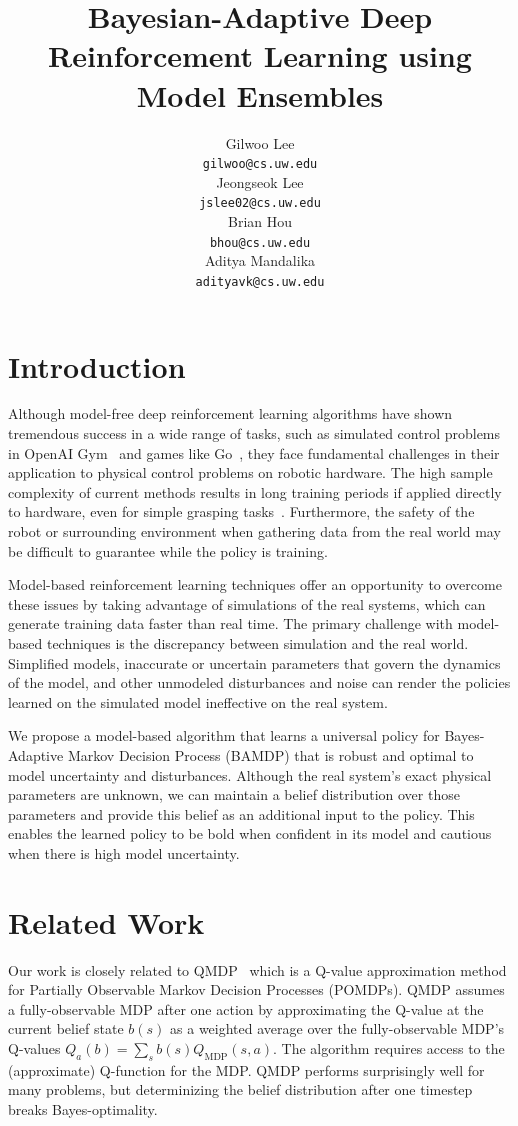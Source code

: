 \documentclass{article}
\title{Bayesian-Adaptive Deep Reinforcement Learning using Model Ensembles}
\author{
  Gilwoo Lee \\ \texttt{gilwoo@cs.uw.edu} \\
  \And
  Jeongseok Lee \\ \texttt{jslee02@cs.uw.edu} \\
  \And
  Brian Hou \\ \texttt{bhou@cs.uw.edu} \\
  \And
  Aditya Mandalika \\ \texttt{adityavk@cs.uw.edu} \\
}
\begin{document}
\maketitle


\section{Introduction}
Although model-free deep reinforcement learning algorithms have shown tremendous success in a wide range of tasks, such as simulated control problems in OpenAI Gym~\cite{openai-gym} and games like Go~\cite{alphago}, they face fundamental challenges in their application to physical control problems on robotic hardware.
The high sample complexity of current methods results in long training periods if applied directly to hardware, even for simple grasping tasks~\cite{levine2016armfarm}.
Furthermore, the safety of the robot or surrounding environment when gathering data from the real world may be difficult to guarantee while the policy is training.

Model-based reinforcement learning techniques offer an opportunity to overcome these issues by taking advantage of simulations of the real systems, which can generate training data faster than real time.
The primary challenge with model-based techniques is the discrepancy between simulation and the real world.
Simplified models, inaccurate or uncertain parameters that govern the dynamics of the model, and other unmodeled disturbances and noise can render the policies learned on the simulated model ineffective on the real system.

We propose a model-based algorithm that learns a universal policy for Bayes-Adaptive Markov Decision Process (BAMDP) that is robust and optimal to model uncertainty and disturbances. Although the real system's exact physical parameters are unknown, we can maintain a belief distribution over those parameters and provide this belief as an additional input to the policy.
This enables the learned policy to be bold when confident in its model and cautious when there is high model uncertainty.

\section{Related Work}
Our work is closely related to QMDP~\cite{littman1995learning, karkus2017qmdp} which is a Q-value approximation method for Partially Observable Markov Decision Processes (POMDPs).
QMDP assumes a fully-observable MDP after one action by approximating the Q-value at the current belief state $b(s)$ as a weighted average over the fully-observable MDP's Q-values $Q_a(b) = \sum_s b(s)Q_{\text{MDP}}(s, a)$.
The algorithm requires access to the (approximate) Q-function for the MDP.
QMDP performs surprisingly well for many problems, but determinizing the belief distribution after one timestep breaks Bayes-optimality.
\end{document}
